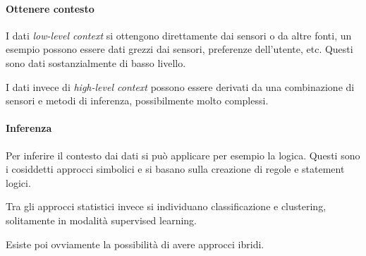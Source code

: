 \paragraph{Ottenere contesto}
I dati \emph{low-level context} si ottengono direttamente dai sensori o da 
altre fonti, un esempio possono essere dati grezzi dai sensori, preferenze dell'utente, etc.
Questi sono dati sostanzialmente di basso livello.

I dati invece di \emph{high-level context} possono essere derivati da una combinazione di 
sensori e metodi di inferenza, possibilmente molto complessi.

\paragraph{Inferenza}
Per inferire il contesto dai dati si può applicare per esempio la logica. Questi 
sono i cosiddetti approcci simbolici e si basano sulla creazione di regole 
e statement logici.

Tra gli approcci statistici invece si individuano classificazione e clustering, 
solitamente in modalità supervised learning.

Esiste poi ovviamente la possibilità di avere approcci ibridi.